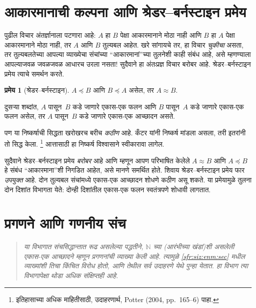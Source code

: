 \documentclass[11pt,a4paper,openany]{book}
\theoremstyle{definition}
\newtheorem{thm}[defn]{प्रमेय}
\newenvironment{explain}{}{}
\newcommand{\Nat}{\mathbb{N}}
\newcommand{\cardle}[2]{#1 \preceq #2}
\newcommand{\cardeq}[2]{#1 \approx #2}
\newenvironment{editorial}{\begin{quote}\small\itshape}{\end{quote}}
\begin{document}
\section{आकारमानाची कल्पना आणि श्रेडर--बर्नस्टाइन प्रमेय}\label{sfr:siz:sb:sec}

\begin{explain}
पुढील विचार अंतर्ज्ञानाला पटणारा आहे: $A$ हा $B$ पेक्षा आकारमानाने मोठा नाही
आणि $B$ हा $A$ पेक्षा आकारमानाने मोठा नाही, तर $A$ आणि $B$ तुल्यबल
आहेत. खरे सांगायचे तर, हा विचार \emph{चुकीचा} असता, तर तुल्यबलतेच्या
आपल्या व्याख्येचा संचांच्या ``आकारमानां''च्या तुलनेशी काही संबंध आहे,
असे म्हणण्याला आपल्याजवळ जवळजवळ आधारच उरला नसता!{} सुदैवाने हा
अंतःप्रज्ञ विचार बरोबर आहे. श्रेडर--बर्नस्टाइन प्रमेय त्याचे समर्थन
करते.
\end{explain}

\begin{thm}[श्रेडर--बर्नस्टाइन]
	\label{sfr:siz:sb:thm:schroder-bernstein}
	$\cardle{A}{B}$ आणि $\cardle{B}{A}$ असेल,
	तर $\cardeq{A}{B}$.
\end{thm}

\begin{explain}
दुसऱ्या शब्दांत, $A$ पासून~$B$ कडे जाणारे एकास-एक फलन आणि $B$
पासून~$A$ कडे जाणारे एकास-एक फलन असेल, तर $A$ पासून~$B$ कडे
जाणारे एकास-एक आच्छादन असते.

पण या निष्कर्षाची सिद्धता खरोखरच बरीच \emph{कठीण} आहे. कँटर यांनी
निष्कर्ष मांडला असला, तरी इतरांनी तो सिद्ध केला.
\footnote{इतिहासाच्या अधिक माहितीसाठी, उदाहरणार्थ,
Potter (2004, pp.~165--6) पाहा.}
%
आत्तासाठी हा निष्कर्ष विश्वासाने स्वीकारावा लागेल.

सुदैवाने श्रेडर--बर्नस्टाइन प्रमेय \emph{बरोबर} आहे आणि म्हणून आपण
परिभाषित केलेले $\cardeq{A}{B}$ आणि $\cardle{A}{B}$ हे संबंध
``आकारमाना''शी निगडित आहेत, असे मानणे समर्थित होते. शिवाय
श्रेडर--बर्नस्टाइन प्रमेय फार \emph{उपयुक्त} आहे. दोन तुल्यबल संचांमध्ये
एकास-एक आच्छादन शोधणे कठीण असू शकते. या प्रमेयामुळे तुलना दोन दिशांत
विभागता येते: दोन्ही दिशांतील एकास-एक फलन स्वतंत्रपणे शोधावी
लागतात.
\end{explain}








\section{प्रगणने आणि गणनीय संच}\label{sfr:siz:enm-alt:sec}

\begin{editorial}
  या विभागात संचसिद्धान्तात रूढ असलेल्या पद्धतीने, $\Nat$ च्या
  (आरंभीच्या खंडां)शी असलेली एकास-एक आच्छादने म्हणून प्रगणनांची
  व्याख्या केली आहे. त्यामुळे \ref{sfr:siz:enm:sec} मधील व्याख्यांशी तिचा
  किंचित विरोध होतो, आणि तेथील सर्व उदाहरणे येथे पुन्हा येतात. हा
  विभाग त्या विभागापेक्षा थोडा अधिक संक्षिप्तही आहे.
\end{editorial}
\end{document}
